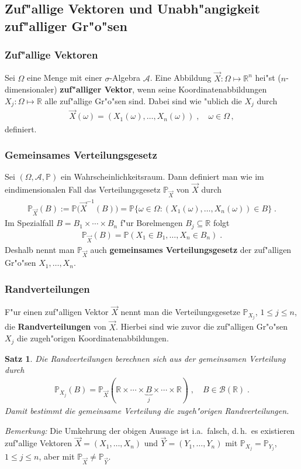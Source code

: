 \documentclass[ngerman,draft,parskip=half,twoside]{scrartcl}
\newtheorem{thm}{Satz}[section]
\newcommand*{\R}{\mathbb{R}}      %
\newcommand*{\Algeb}{\mathcal{A}}   %
\newcommand*{\BorelM}{\mathcal{B}}  %
\newcommand*{\WKM}{\mathbb{P}}      %
\begin{document}
\subsection{Zuf"allige Vektoren und Unabh"angigkeit zuf"alliger Gr"o"sen}
\subsubsection{Zuf"allige Vektoren}
Sei $\Omega$ eine Menge mit einer $\sigma$-Algebra $\Algeb$. Eine Abbildung $\vec X \colon \Omega\mapsto\R^n$
hei"st ($n$-dimensionaler) \textbf{zuf"alliger Vektor}, wenn seine Koordinatenabbildungen
$X_j \colon\Omega\mapsto \R$ alle zuf"allige Gr"o"sen sind. Dabei sind wie "ublich die $X_j$ durch
\begin{gather*}
  \vec X(\omega)=(X_1(\omega),\ldots,X_n(\omega))\;,\quad \omega\in\Omega\,,
\end{gather*}
definiert.

\subsubsection{Gemeinsames Verteilungsgesetz}
Sei $(\Omega,\Algeb,\WKM)$ ein Wahrscheinlichkeitsraum. Dann definiert
man wie im eindimensionalen Fall das Verteilungsgesetz $\WKM_{\vec X}$ von $\vec X$
durch
\begin{gather*}
  \WKM_{\vec X}(B):=\WKM\big(\vec X^{-1}(B)\big)=\WKM\{\omega\in\Omega \colon (X_1(\omega),\ldots,X_n(\omega))\in B\}\;.
\end{gather*}
Im Spezialfall $B=B_1\times\cdots\times B_n$ f"ur Borelmengen $B_j\subseteq\R$ folgt
\begin{gather*}
  \WKM_{\vec X}(B)=\WKM(X_1\in B_1,\ldots, X_n\in B_n)\;.
\end{gather*}
Deshalb nennt man $\WKM_{\vec X}$ auch \textbf{gemeinsames Verteilungsgesetz} der zuf"alligen
Gr"o"sen $X_1,\ldots,X_n$.
\subsubsection{Randverteilungen}
F"ur einen zuf"alligen Vektor $\vec X$ nennt man die Verteilungsgesetze $\WKM_{X_j}$, $1\le j\le n$,
die \textbf{Randverteilungen} von $\vec X$. Hierbei sind wie zuvor die zuf"alligen Gr"o"sen $X_j$ die
zugeh"origen Koordinatenabbildungen.
\begin{thm}
Die Randverteilungen berechnen sich aus der gemeinsamen Verteilung durch
  \begin{gather*}
    \WKM_{X_j}(B)= \WKM_{\vec X}(\R\times\cdots\times \underbrace{B}_j\times\cdots\times\R)\;,\quad B\in\BorelM(\R)\;.
  \end{gather*}
Damit bestimmt die gemeinsame Verteilung die zugeh"origen Randverteilungen.
\end{thm}
\textit{Bemerkung:} Die Umkehrung der obigen Aussage ist i.a.~falsch, d.\,h.~es existieren zuf"allige
Vektoren $\vec X=(X_1,\ldots,X_n)$ und $\vec Y=(Y_1,\ldots, Y_n)$ mit $\WKM_{X_j}=\WKM_{Y_j}$,
$1\le j\le n$, aber mit $\WKM_{\vec X}\not=\WKM_{\vec Y}$.
\end{document}
